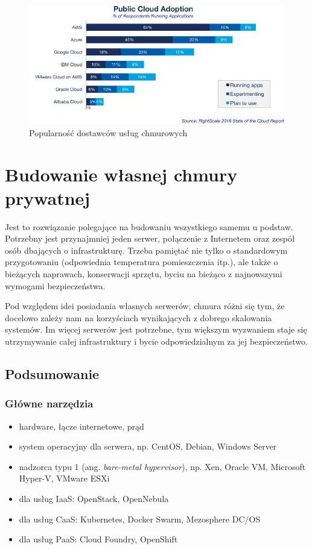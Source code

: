 \documentclass[12pt,a4paper,twoside,titlepage,openright]{book}
\begin{document}
\begin{figure}[h]
	\centering
			\includegraphics[width=\textwidth]{popularnosc.png}
		\caption{Popularność dostawców usług chmurowych \cite{rightscaleReport}}
		\label{fig:popularnosc}
\end{figure}

\section{Budowanie własnej chmury prywatnej} \label{section:chmuraPrywatna}

Jest to rozwiązanie polegające na budowaniu wszystkiego samemu u podstaw. Potrzebny jest przynajmniej jeden serwer, połączenie z Internetem oraz zespół osób dbających o infrastrukturę. Trzeba pamiętać nie tylko o standardowym przygotowaniu (odpowiednia temperatura pomieszczenia itp.), ale także o bieżących naprawach, konserwacji sprzętu, byciu na bieżąco z najnowszymi wymogami bezpieczeństwa. 

Pod względem idei posiadania własnych serwerów, chmura różni się tym, że docelowo zależy nam na korzyściach wynikających z dobrego skalowania systemów. Im więcej serwerów jest potrzebne, tym większym wyzwaniem staje się utrzymywanie całej infrastruktury i bycie odpowiedzialnym za jej bezpieczeństwo. 

\subsection*{Podsumowanie}

\subsubsection*{Główne narzędzia}
\begin{itemize}
\item hardware, łącze internetowe, prąd
\item system operacyjny dla serwera, np. CentOS, Debian, Windows Server
\item nadzorca typu 1 (ang. \textit{bare-metal hypervisor}), np. Xen, Oracle VM, Microsoft Hyper-V, VMware ESXi
\item dla usług IaaS: OpenStack, OpenNebula
\item dla usług CaaS: Kubernetes, Docker Swarm, Mezosphere DC/OS
\item dla usług PaaS: Cloud Foundry, OpenShift
\end{itemize}
\end{document}
